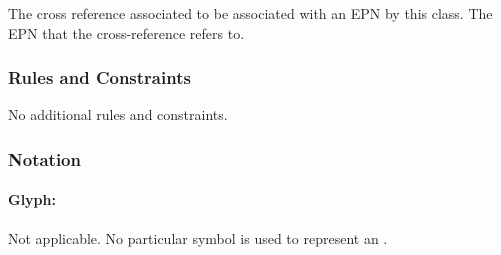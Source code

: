 \begin{attributes}
 The cross reference
associated to be associated with an EPN by this class.
 The EPN that the
cross-reference refers to.
\end{attributes}

\subsubsection{Rules and Constraints}

No additional rules and constraints.

\subsubsection{Notation}

\paragraph{Glyph:  }\label{sec:techref:equivalenceArc}

\begin{glyphDescription}
 \glyphSboTerm Not applicable.
 \glyphEndPoint No particular symbol is used to represent an .
 \end{glyphDescription}

